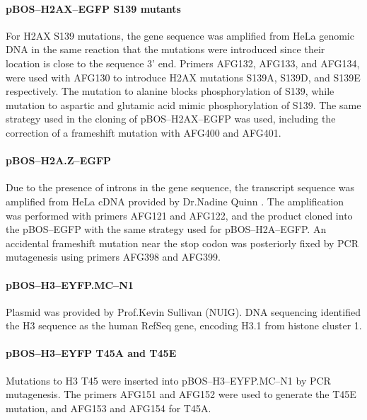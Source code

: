       \paragraph{pBOS--H2AX--EGFP S139 mutants}
      For H2AX S139 mutations, the  gene sequence was
      amplified from HeLa genomic DNA in the same reaction that the
      mutations were introduced since their location is close to the
      sequence 3' end.  Primers AFG132, AFG133, and AFG134, were used
      with AFG130 to introduce H2AX mutations S139A, S139D, and S139E
      respectively.  The mutation to alanine blocks phosphorylation of
      S139, while mutation to aspartic and glutamic acid mimic
      phosphorylation of S139.  The same strategy used in the cloning
      of pBOS--H2AX--EGFP was used, including the correction of a
      frameshift mutation with AFG400 and AFG401.

      \paragraph{pBOS--H2A.Z--EGFP}
      Due to the presence of introns in the  gene
      sequence, the transcript sequence was amplified from HeLa cDNA
      provided by Dr.\@ Nadine Quinn \citep{NadineThesis}.  The
      amplification was performed with primers AFG121 and AFG122, and
      the product cloned into the pBOS--EGFP with the same strategy
      used for pBOS--H2A--EGFP.
      An accidental frameshift mutation near the stop codon was
      posteriorly fixed by PCR mutagenesis using primers AFG398 and
      AFG399.

      \paragraph{pBOS--H3--EYFP.MC--N1}
      Plasmid was provided by Prof.\@ Kevin Sullivan (NUIG).  DNA
      sequencing identified the H3 sequence as the human RefSeq
       gene, encoding H3.1 from histone cluster 1.

      \paragraph{pBOS--H3--EYFP T45A and T45E}
      Mutations to H3 T45 were inserted into pBOS--H3--EYFP.MC--N1 by
      PCR mutagenesis. The primers AFG151 and AFG152 were used
      to generate the
      T45E mutation, and AFG153 and AFG154 for T45A.


